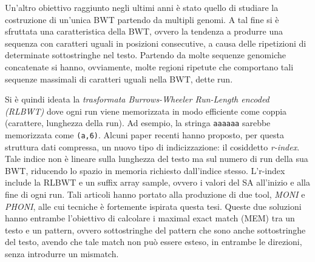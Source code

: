 \documentclass[a4paper,11pt, oneside,italian]{article}
\begin{document}
Un'altro obiettivo raggiunto negli ultimi anni è stato quello di studiare la
costruzione di un'unica BWT partendo da multipli genomi.
A tal fine si è sfruttata una caratteristica della BWT, ovvero la
tendenza a produrre una sequenza con caratteri uguali in posizioni
consecutive, a causa delle ripetizioni di determinate
sottostringhe nel testo. Partendo da molte sequenze genomiche concatenate si
hanno, ovviamente, molte regioni ripetute che comportano tali sequenze massimali
di caratteri uguali nella BWT, dette run.

Si è quindi ideata la \textit{trasformata Burrows-Wheeler Run-Length
  encoded (RLBWT)} dove ogni run viene memorizzata in modo efficiente come
coppia (carattere, lunghezza della run). Ad esempio, la stringa \texttt{aaaaaa}
sarebbe memorizzata come \texttt{(a,6)}.
Alcuni paper recenti hanno proposto, per questa struttura
dati compressa, un nuovo tipo di indicizzazione: il cosiddetto \textit{r-index}.
Tale indice non è lineare sulla lunghezza del testo ma sul numero di run della
sua BWT, riducendo lo spazio in 
memoria richiesto dall'indice stesso. L'r-index include la
RLBWT e un suffix array sample, ovvero i valori del SA all’inizio e alla fine di
ogni run. 
Tali articoli hanno portato alla produzione di due tool, \textit{MONI} e 
\textit{PHONI}, alle cui tecniche è fortemente ispirata questa tesi. Queste due
soluzioni hanno entrambe l'obiettivo di 
calcolare i maximal exact match (MEM) tra un testo e un pattern, ovvero
sottostringhe del pattern che 
sono anche sottostringhe del testo, avendo che tale match non può essere esteso,
in entrambe le direzioni, senza introdurre un mismatch. 
\end{document}
